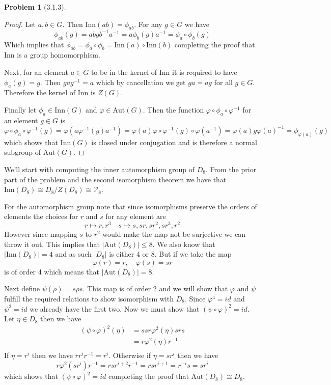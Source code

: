 \documentclass[10pt]{article}
\theoremstyle{plain}
\newtheorem{problem}{Problem}
\theoremstyle{remark}
\begin{document}
\begin{problem}[3.1.3] %
  
\end{problem}

\begin{proof}
  Let $a,b\in G$. Then $\text{Inn}(ab)=\phi_{ab}$. For any $g\in G$ we have
  \[\phi_{ab}(g)=abgb^{-1}a^{-1}=a\phi_b(g)a^{-1}=\phi_a\circ\phi_b(g)\]
  Which implies that $\phi_{ab}=\phi_a\circ\phi_b=\text{Inn}(a)\circ\text{Inn}(b)$
  completing the proof that $\text{Inn}$ is a group homomorphism.

  Next, for an element $a\in G$ to be in the kernel of $\text{Inn}$
  it is required to have $\phi_a(g)=g$. Then
  $gag^{-1}=a$ which by cancellation we get $ga=ag$ for all $g\in G$.
  Therefore the kernel of $\text{Inn}$ is $Z(G)$.

  Finally let $\phi_a\in\text{Inn}(G)$ and $\varphi\in\text{Aut}(G)$. Then
  the function $\varphi\circ\phi_a\circ\varphi^{-1}$ for an element $g\in G$ is
  \[ \varphi\circ\phi_a\circ\varphi^{-1}(g)=\varphi(a\varphi^{-1}(g)a^{-1})=\varphi(a)\varphi\circ\varphi^{-1}(g)\circ\varphi(a^{-1})=\varphi(a)g\varphi(a)^{-1}=\phi_{\varphi(a)}(g) \]
  which shows that $\text{Inn}(G)$ is closed under conjugation and is therefore a
  normal subgroup of $\text{Aut}(G)$.
\end{proof}


We'll start with computing the inner automorphism group of $D_8$. From the prior part of the
problem and the second isomorphism theorem we have that $\text{Inn}(D_8)\cong D_8/Z(D_8)\cong \mathcal{V}_8$.

For the automorphism group note that since isomorphisms preserve the orders of elements the
choices for $r$ and $s$ for any element are
\[ r \mapsto r,r^3\quad s\mapsto s,sr,sr^2,sr^3,r^2\]
However since mapping $s$ to $r^2$ would make the map not be surjective we can throw it out.
This implies that $|\text{Aut}(D_8)|\leq 8$. We also know that $|\text{Inn}(D_8)|=4$ and as
such $|D_8|$ is either 4 or 8. But if we take the map
\[ \varphi(r)=r,\quad \varphi(s)=sr\]
is of order 4 which means that $|\text{Aut}(D_8)|=8$.

Next define $\psi(\rho)=s\rho s$. This map is of order 2 and we will show that $\varphi$ and $\psi$ fulfill the
required relations to show isomorphism with $D_8$. Since $\varphi^4=id$ and $\psi^2=id$ we already have
the first two. Now we must show that $(\psi\circ \varphi)^2=id$. Let $\eta\in D_8$ then we have
\begin{align*}
  (\psi\circ\varphi)^2(\eta) &= ssr\varphi^2(\eta)srs\\
            &= r\varphi^2(\eta)r^{-1}\\
\end{align*}
If $\eta=r^i$ then we have $rr^ir^{-1}=r^i$. Otherwise if $\eta=sr^i$ then we have
\[ r\varphi^2(sr^i)r^{-1}=rsr^{i+2}r^{-1}=rsr^{i+1}=r^{-i}s=sr^i \]
which shows that $(\psi\circ\varphi)^2=id$ completing the proof that
$\text{Aut}(D_8)\cong D_8$.
\end{document}
